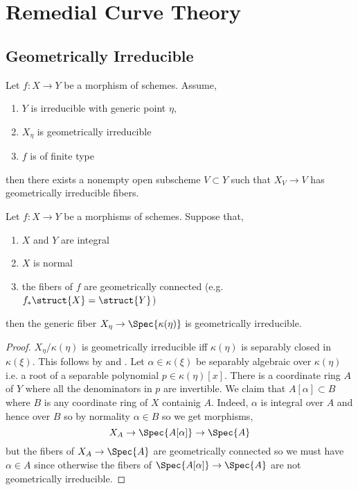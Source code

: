 \documentclass[12pt]{article}
\begin{document}
\section{Remedial Curve Theory}


\subsection{Geometrically Irreducible}

\begin{lemma} 
Let $f : X \to Y$ be a morphism of schemes. Assume,
\begin{enumerate}
\item $Y$ is irreducible with generic point $\eta$,
\item $X_\eta$ is geometrically irreducible
\item $f$ is of finite type
\end{enumerate}
then there exists a nonempty open subscheme $V \subset Y$ such that $X_V \to V$ has geometrically irreducible fibers.
\end{lemma}

\begin{lemma}
Let $f : X \to Y$ be a morphisms of schemes. Suppose that,
\begin{enumerate}
\item $X$ and $Y$ are integral
\item $X$ is normal
\item the fibers of $f$ are geometrically connected (e.g. $f_* \struct{X} = \struct{Y}$)
\end{enumerate} 
then the generic fiber $X_{\eta} \to \Spec{\kappa(\eta)}$ is geometrically irreducible.
\end{lemma}

\begin{proof}
$X_{\eta} / \kappa(\eta)$ is geometrically irreducible iff $\kappa(\eta)$ is separably closed in $\kappa(\xi)$. This follows by  and . Let $\alpha \in \kappa(\xi)$ be separably algebraic over $\kappa(\eta)$ i.e. a root of a separable polynomial $p \in \kappa(\eta)[x]$. There is a coordinate ring $A$ of $Y$ where all the denominators in $p$ are invertible. We claim that $A[\alpha] \subset B$ where $B$ is any coordinate ring of $X$ containig $A$. Indeed, $\alpha$ is integral over $A$ and hence over $B$ so by normality $\alpha \in B$ so we get morphisms,
\[ X_A \to \Spec{A[\alpha]} \to \Spec{A} \]
but the fibers of $X_A \to \Spec{A}$ are geometrically connected so we must have $\alpha \in A$ since otherwise the fibers of $\Spec{A[\alpha]} \to \Spec{A}$ are not geometrically irreducible.
\end{proof}
\end{document}
